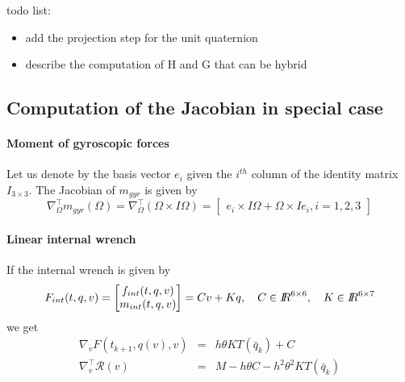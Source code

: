 \begin{ndrva}

  todo list:
  
  \begin{itemize}


  \item add the projection step for the unit quaternion

  \item describe the computation of H and G that can be hybrid

    
\end{itemize}

\end{ndrva}


\subsection{Computation of the Jacobian in special case}

\paragraph{Moment of gyroscopic forces}
Let us denote by the basis vector $e_i$ given the $i^{th}$ column of the identity matrix $I_{3\times3}$. The Jacobian of $m_{gyr}$ is given by
\begin{equation}
  \label{eq:8}
  \nabla^\top_\Omega m_{gyr}(\Omega) = \nabla^\top_\Omega (\Omega \times I \Omega) =
  \begin{bmatrix}
    e_i \times I \Omega + \Omega \times I e_i, i =1,2,3
  \end{bmatrix}
\end{equation}

\paragraph{Linear internal wrench}
If the internal wrench  is given by
\begin{equation}
  \label{eq:9}
  F_{int}(t,q,v) =
  \begin{bmatrix}
    f_{int}(t,q,v)\\
    m_{int}(t,q,v)
  \end{bmatrix}
  = C v + K q, \quad C \in \mbox{\rm $I\!\!R$}^{6\times 6}, \quad K \in \mbox{\rm $I\!\!R$}^{6\times 7 }
\end{equation}
we get
\begin{equation}
  \label{eq:6}
  \begin{array}{lcl}
    \nabla_v F(t_{k+1}, q(v),v)  &=& h \theta K T(\bar q_k) + C \\
    \nabla^\top_v \mathcal R(v) &=& M - h \theta C - h^2 \theta^2 K T(\bar q_k)
  \end{array}
\end{equation}






